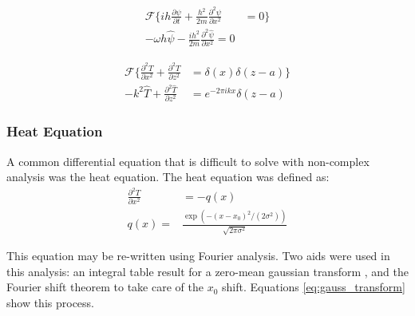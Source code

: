 \documentclass[twocolumn]{article}
\begin{document}
\begin{equation}
\begin{split}
\mathcal{F} \{ih \frac{\partial \psi}{\partial t} + \frac{h^2}{2m} \frac{\partial^2 \psi}{\partial x^2} &= 0 \} \\
-\omega h \hat{\psi} - \frac{ih^2}{2m} \frac{\partial^2 \hat{\psi}}{\partial x^2} = 0
\end{split}
\end{equation}

\begin{equation}
\begin{split}
\mathcal{F} \{ \frac{\partial^2 T}{\partial x^2} + \frac{\partial^2 T}{\partial z^2} &= \delta (x) \delta (z - a) \}\\
-k^2 \hat{T} + \frac{\partial^2 \hat{T}}{\partial z^2} &= e^{-2\pi ik x} \delta (z - a)
\end{split}
\end{equation}

\subsubsection{Heat Equation}
A common differential equation that is difficult to solve with non-complex analysis was the heat equation. The heat equation was defined as:
\begin{equation}
\begin{split}
\frac{\partial^2 T}{\partial x^2} &= -q(x)\\
q(x) =& \frac{\exp(-(x-x_0)^2/(2\sigma^2))}{\sqrt{2\pi\sigma^2}}
\end{split}
\end{equation}

This equation may be re-written using Fourier analysis. Two aids were used in this analysis: an integral table result for a zero-mean gaussian transform \cite{gauss_trans}, and the Fourier shift theorem to take care of the $x_0$ shift. Equations \ref{eq:gauss_transform} show this process.
\end{document}
